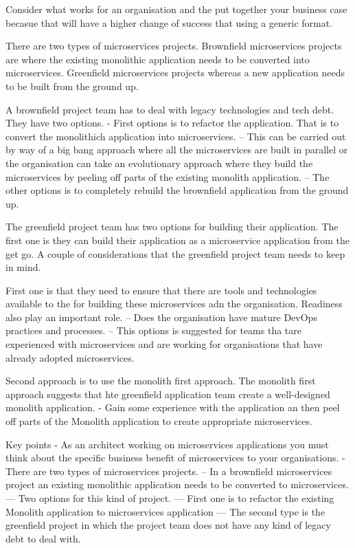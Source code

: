 \documentclass[a4paper, 11pt]{book}
\begin{document}
    Consider what works for an organisation and the put together your business case becasue that will have a higher change of success that using a generic format.


    There are two types of microservices projects.
    Brownfield microservices projects are where the existing monolithic application needs to be converted into microservices.
    Greenfield microservices projects whereas a new application needs to be built from the ground up.

    A brownfield project team has to deal with legacy technologies and tech debt. They have two options.
    - First options is to refactor the application. That is to convert the monolithich application into microservices.
    -- This can be carried out by way of a big bang approach where all the microservices are built in parallel or the organisation can take an evolutionary approach where they build the microservices by peeling off parts of the existing monolith application.
    -- The other options is to completely rebuild the brownfield application from the ground up.

    The greenfield project team has two options for building their application.
    The first one is they can build their application as a microservice application from the get go.
    A couple of considerations that the greenfield project team needs to keep in mind.

    First one is that they need to ensure that there are tools and technologies available to the for building these microservices adn the organisation.
    Readiness also play an important role.
    -- Does the organisation have mature DevOps practices and processes.
    -- This options is suggested for teams tha tare experienced with microservices and are working for organisations that have already adopted microservices.

    Second approach is to use the monolith first approach.
    The monolith first approach suggests that hte greenfield application team create a well-designed monolith application.
    - Gain some experience with the application an then peel off parts of the Monolith application to create appropriate microservices.

    Key points
    - As an architect working on microservices applications you must think about the specific business benefit of microservices to your organisations.
    - There are two types of microservices projects.
    -- In a brownfield microservices project an existing monolithic application needs to be converted to microservices.
    --- Two options for this kind of project.
    --- First one is to refactor the existing Monolith application to microservices application
    --- The second type is the greenfield project in which the project team does not have any kind of legacy debt to deal with.
\end{document}
